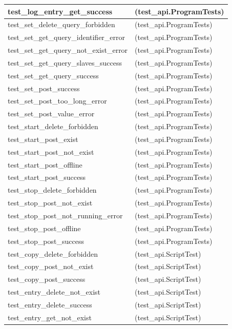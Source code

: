 \begin{longtable}{|p{10cm}|p{7cm}|}
test\_log\_entry\_get\_success & (test\_api.ProgramTests)\\\hline
test\_set\_delete\_query\_forbidden & (test\_api.ProgramTests)\\\hline
test\_set\_get\_query\_identifier\_error & (test\_api.ProgramTests)\\\hline
test\_set\_get\_query\_not\_exist\_error & (test\_api.ProgramTests)\\\hline
test\_set\_get\_query\_slaves\_success & (test\_api.ProgramTests)\\\hline
test\_set\_get\_query\_success & (test\_api.ProgramTests)\\\hline
test\_set\_post\_success & (test\_api.ProgramTests)\\\hline
test\_set\_post\_too\_long\_error & (test\_api.ProgramTests)\\\hline
test\_set\_post\_value\_error & (test\_api.ProgramTests)\\\hline
test\_start\_delete\_forbidden & (test\_api.ProgramTests)\\\hline
test\_start\_post\_exist & (test\_api.ProgramTests)\\\hline
test\_start\_post\_not\_exist & (test\_api.ProgramTests)\\\hline
test\_start\_post\_offline & (test\_api.ProgramTests)\\\hline
test\_start\_post\_success & (test\_api.ProgramTests)\\\hline
test\_stop\_delete\_forbidden & (test\_api.ProgramTests)\\\hline
test\_stop\_post\_not\_exist & (test\_api.ProgramTests)\\\hline
test\_stop\_post\_not\_running\_error & (test\_api.ProgramTests)\\\hline
test\_stop\_post\_offline & (test\_api.ProgramTests)\\\hline
test\_stop\_post\_success & (test\_api.ProgramTests)\\\hline
test\_copy\_delete\_forbidden & (test\_api.ScriptTest)\\\hline
test\_copy\_post\_not\_exist & (test\_api.ScriptTest)\\\hline
test\_copy\_post\_success & (test\_api.ScriptTest)\\\hline
test\_entry\_delete\_not\_exist & (test\_api.ScriptTest)\\\hline
test\_entry\_delete\_success & (test\_api.ScriptTest)\\\hline
test\_entry\_get\_not\_exist & (test\_api.ScriptTest)\\\hline

\end{longtable}
